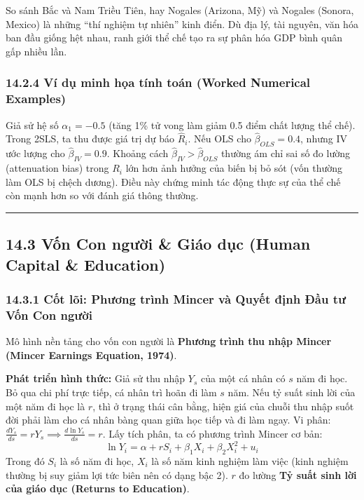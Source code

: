 \documentclass[
]{article}
\begin{document}
So sánh Bắc và Nam Triều Tiên, hay Nogales (Arizona, Mỹ) và Nogales
(Sonora, Mexico) là những ``thí nghiệm tự nhiên'' kinh điển. Dù địa lý,
tài nguyên, văn hóa ban đầu giống hệt nhau, ranh giới thể chế tạo ra sự
phân hóa GDP bình quân gấp nhiều lần.

\subsubsection{14.2.4 Ví dụ minh họa tính toán (Worked Numerical
Examples)}\label{vuxed-dux1ee5-minh-hux1ecda-tuxednh-touxe1n-worked-numerical-examples-39}

Giả sử hệ số \(\alpha_1 = -0.5\) (tăng 1\% tử vong làm giảm 0.5 điểm
chất lượng thể chế). Trong 2SLS, ta thu được giá trị dự báo
\(\hat{R}_i\). Nếu OLS cho \(\hat{\beta}_{OLS} = 0.4\), nhưng IV ước
lượng cho \(\hat{\beta}_{IV} = 0.9\). Khoảng cách
\(\hat{\beta}_{IV} > \hat{\beta}_{OLS}\) thường ám chỉ sai số đo lường
(attenuation bias) trong \(R_i\) lớn hơn ảnh hưởng của biến bị bỏ sót
(vốn thường làm OLS bị chệch dương). Điều này chứng minh tác động thực
sự của thể chế còn mạnh hơn so với đánh giá thông thường.

\begin{center}\rule{0.5\linewidth}{0.5pt}\end{center}

\subsection{14.3 Vốn Con người \& Giáo dục (Human Capital \&
Education)}\label{vux1ed1n-con-ngux1b0ux1eddi-giuxe1o-dux1ee5c-human-capital-education}

\subsubsection{14.3.1 Cốt lõi: Phương trình Mincer và Quyết định Đầu tư
Vốn Con
người}\label{cux1ed1t-luxf5i-phux1b0ux1a1ng-truxecnh-mincer-vuxe0-quyux1ebft-ux111ux1ecbnh-ux111ux1ea7u-tux1b0-vux1ed1n-con-ngux1b0ux1eddi}

Mô hình nền tảng cho vốn con người là \textbf{Phương trình thu nhập
Mincer (Mincer Earnings Equation, 1974)}.

\textbf{Phát triển hình thức:} Giả sử thu nhập \(Y_s\) của một cá nhân
có \(s\) năm đi học. Bỏ qua chi phí trực tiếp, cá nhân trì hoãn đi làm
\(s\) năm. Nếu tỷ suất sinh lời của một năm đi học là \(r\), thì ở trạng
thái cân bằng, hiện giá của chuỗi thu nhập suốt đời phải làm cho cá nhân
bàng quan giữa học tiếp và đi làm ngay. Vi phân:
\(\frac{d Y_s}{ds} = r Y_s \implies \frac{d \ln Y_s}{ds} = r\). Lấy tích
phân, ta có phương trình Mincer cơ bản:
\[ \ln Y_i = \alpha + r S_i + \beta_1 X_i + \beta_2 X_i^2 + u_i \] Trong
đó \(S_i\) là số năm đi học, \(X_i\) là số năm kinh nghiệm làm việc
(kinh nghiệm thường bị suy giảm lợi tức biên nên có dạng bậc 2). \(r\)
đo lường \textbf{Tỷ suất sinh lời của giáo dục (Returns to Education)}.
\end{document}
